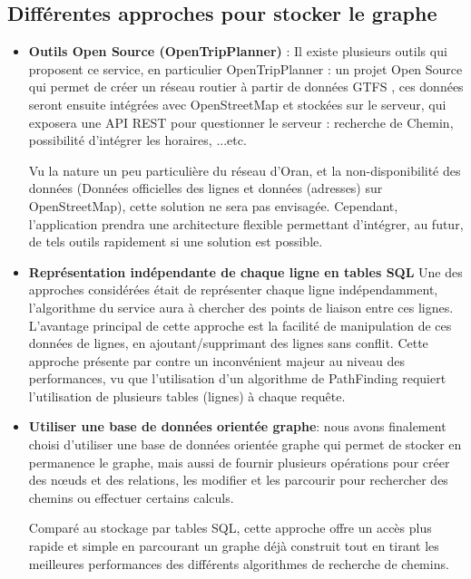 \subsection{Différentes approches pour stocker le graphe}
\begin{itemize}
	\item \textbf{Outils Open Source (OpenTripPlanner)} : 
	      Il existe plusieurs outils qui proposent ce service, en particulier OpenTripPlanner : un projet Open Source qui permet de créer un réseau routier à partir de données GTFS , ces données seront ensuite intégrées avec OpenStreetMap et stockées sur le serveur, qui exposera une API REST pour questionner le serveur : recherche de Chemin, possibilité d'intégrer les horaires, ...etc.
	      		
	      Vu la nature un peu particulière du réseau d'Oran, et la non-disponibilité des données (Données officielles des lignes et données (adresses) sur OpenStreetMap), cette solution ne sera pas envisagée. 
	      Cependant, l'application prendra une architecture flexible permettant d'intégrer, au futur, de tels outils rapidement si une solution est possible.
	\item \textbf{Représentation indépendante de chaque ligne en tables SQL}
	      Une des approches considérées était de représenter chaque ligne indépendamment, l'algorithme du service aura à chercher des points de liaison entre ces lignes.
	      L'avantage principal de cette approche est la facilité de manipulation de ces données de lignes, en ajoutant/supprimant des lignes sans conflit.
	      Cette approche présente par contre un inconvénient majeur au niveau des performances, vu que l'utilisation d'un algorithme de PathFinding requiert l'utilisation de plusieurs tables (lignes) à chaque requête.
	      
	\item \textbf{Utiliser une base de données orientée graphe}: nous avons finalement choisi d'utiliser une base de données orientée graphe qui permet de stocker en permanence le graphe, mais aussi de fournir plusieurs opérations pour créer des nœuds et des relations, les modifier et les parcourir pour rechercher des chemins ou effectuer certains calculs.
	
Comparé au stockage par tables SQL, cette approche offre un accès plus rapide et simple en parcourant un graphe déjà construit tout en tirant les meilleures performances des différents algorithmes de recherche de chemins.


\end{itemize}
